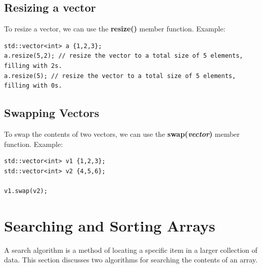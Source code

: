 \documentclass{report}
\begin{document}
    \bigbreak \noindent 
    \subsection{Resizing a vector}
    \bigbreak \noindent 
    To resize a vector, we can use the \textbf{resize()} member function.
    \bigbreak \noindent 
    Example:
    \bigbreak \noindent 
    \sepline
    \begin{verbatim}
std::vector<int> a {1,2,3};
a.resize(5,2); // resize the vector to a total size of 5 elements, filling with 2s.
a.resize(5); // resize the vector to a total size of 5 elements, filling with 0s.
    \end{verbatim}
    \sepline

    \bigbreak \noindent 
    \subsection{Swapping Vectors}
    \bigbreak \noindent 
    To swap the contents of two vectors, we can use the \textbf{swap(\textit{vector})} member function.
    \bigbreak \noindent 
    Example:
    \bigbreak \noindent 
    \sepline
    \begin{verbatim}
std::vector<int> v1 {1,2,3};
std::vector<int> v2 {4,5,6};

v1.swap(v2);
    \end{verbatim}
    \sepline

    \pagebreak \bigbreak \noindent 
    \section{\LARGE Searching and Sorting Arrays}
    \bigbreak \noindent 
    \begin{concept}
 A search algorithm is a method of locating a specific item in a larger collection of data. This section discusses two algorithms for searching the contents of an array.
	\end{concept}
    \bigbreak \noindent 
\end{document}
